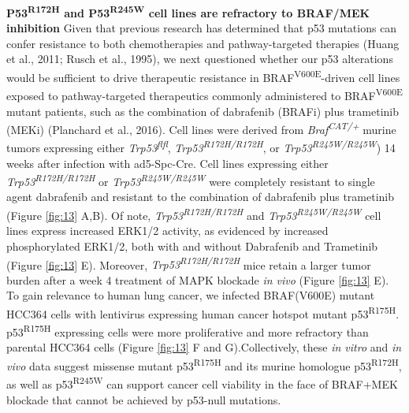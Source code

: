 \textbf{P53\textsuperscript{R172H} and P53\textsuperscript{R245W} cell lines are refractory to BRAF/MEK inhibition}
Given that previous research has determined that p53 mutations can confer resistance to both chemotherapies and pathway-targeted therapies (Huang et al., 2011; Rusch et al., 1995), we next questioned whether our p53 alterations would be sufficient to drive therapeutic resistance in BRAF\textsuperscript{V600E}-driven cell lines exposed to pathway-targeted therapeutics commonly administered to BRAF\textsuperscript{V600E} mutant patients, such as the combination of dabrafenib (BRAFi) plus trametinib (MEKi) (Planchard et al., 2016). Cell lines were derived from \emph{Braf\textsuperscript{CAT/+}} murine tumors expressing either \emph{Trp53\textsuperscript{flfl}}, \emph{Trp53\textsuperscript{R172H/R172H}}, or \emph{Trp53\textsuperscript{R245W/R245W}}) 14 weeks after infection with ad5-Spc-Cre. Cell lines expressing either \emph{Trp53\textsuperscript{R172H/R172H}} or \emph{Trp53\textsuperscript{R245W/R245W}} were completely resistant to single agent dabrafenib and resistant to the combination of dabrafenib plus trametinib (Figure \ref{fig:13} A,B). Of note, \emph{Trp53\textsuperscript{R172H/R172H}} and \emph{Trp53\textsuperscript{R245W/R245W}} cell lines express increased ERK1/2 activity, as evidenced by increased phosphorylated ERK1/2, both with and without Dabrafenib and Trametinib (Figure \ref{fig:13} E). Moreover, \emph{Trp53\textsuperscript{R172H/R172H}} mice retain a larger tumor burden after a week 4 treatment of MAPK blockade \emph{in vivo} (Figure \ref{fig:13} E). To gain relevance to human lung cancer, we infected BRAF(V600E) mutant HCC364 cells with lentivirus expressing human cancer hotspot mutant p53\textsuperscript{R175H}. p53\textsuperscript{R175H} expressing cells were more proliferative and more refractory than parental HCC364 cells (Figure \ref{fig:13} F and G).Collectively, these \emph{in vitro} and \emph{in vivo} data suggest missense mutant p53\textsuperscript{R175H} and its murine homologue p53\textsuperscript{R172H}, as well as p53\textsuperscript{R245W} can support cancer cell viability in the face of BRAF+MEK blockade that cannot be achieved by p53-null mutations.


